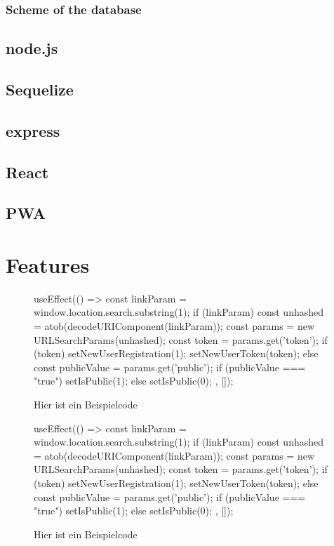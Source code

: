 \documentclass[a4paper,12pt]{report}
\begin{document}
\subsection{Scheme of the database}
\section{node.js}
\section{Sequelize}
\section{express}
\section{React}
\section{PWA}
\chapter{Features}
\begin{figure}[h!]
\begin{code}
useEffect(() => {
	const linkParam = window.location.search.substring(1);
	if (linkParam) {
		const unhashed = atob(decodeURIComponent(linkParam));
		const params = new URLSearchParams(unhashed);
		const token = params.get('token');
		if (token) {
			setNewUserRegistration(1);
			setNewUserToken(token);
		} else {
			const publicValue = params.get('public');
			if (publicValue === "true") {
				setIsPublic(1);
			} else {
				setIsPublic(0);
			}
		}
	}
}, []);
\end{code}
	\caption{Hier ist ein Beispielcode}
	\label{fig:beispielcode}
\end{figure}
\begin{figure}[h!]
	\begin{code}
		useEffect(() => {
			const linkParam = window.location.search.substring(1);
			if (linkParam) {
				const unhashed = atob(decodeURIComponent(linkParam));
				const params = new URLSearchParams(unhashed);
				const token = params.get('token');
				if (token) {
					setNewUserRegistration(1);
					setNewUserToken(token);
				} else {
					const publicValue = params.get('public');
					if (publicValue === "true") {
						setIsPublic(1);
					} else {
						setIsPublic(0);
					}
				}
			}
		}, []);
	\end{code}
	\caption{Hier ist ein Beispielcode}
	\label{fig:beispielcode2}
\end{figure}
\end{document}
